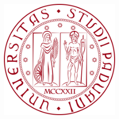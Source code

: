 \begin{titlepage}
    \begin{center}
        \begin{LARGE}
            \textbf{\myUni}\\
        \end{LARGE}

        \vspace{5pt}

        \begin{Large}
            \textsc{\myDepartment}\\
        \end{Large}

        \vspace{5pt}

        \begin{large}
            \textsc{\myFaculty}\\
        \end{large}

        \vspace{25pt}
        
        \begin{figure}[htbp]
            \centering
            \includegraphics[height=6cm]{img/logo_unipd.png}
        \end{figure}
        
        \vspace{25pt}

        \begin{LARGE}
            \textbf{\myTitle}\\
        \end{LARGE}

        \vspace{10pt}

        \begin{large}
            \textsl{\myDegree}\\
        \end{large}


\end{center}
\end{titlepage}
